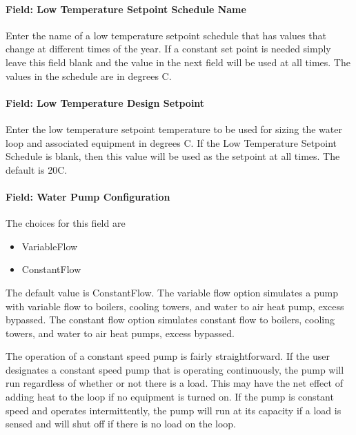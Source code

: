 \paragraph{Field: Low Temperature Setpoint Schedule Name}\label{field-low-temperature-setpoint-schedule-name}

Enter the name of a low temperature setpoint schedule that has values that change at different times of the year. If a constant set point is needed simply leave this field blank and the value in the next field will be used at all times. The values in the schedule are in degrees C.

\paragraph{Field: Low Temperature Design Setpoint}\label{field-low-temperature-design-setpoint}

Enter the low temperature setpoint temperature to be used for sizing the water loop and associated equipment in degrees C. If the Low Temperature Setpoint Schedule is blank, then this value will be used as the setpoint at all times. The default is 20C.

\paragraph{Field: Water Pump Configuration}\label{field-water-pump-configuration}

The choices for this field are

\begin{itemize}
\item
  VariableFlow
\item
  ConstantFlow
\end{itemize}

The default value is ConstantFlow. The variable flow option simulates a pump with variable flow to boilers, cooling towers, and water to air heat pump, excess bypassed. The constant flow option simulates constant flow to boilers, cooling towers, and water to air heat pumps, excess bypassed.

The operation of a constant speed pump is fairly straightforward. If the user designates a constant speed pump that is operating continuously, the pump will run regardless of whether or not there is a load. This may have the net effect of adding heat to the loop if no equipment is turned on. If the pump is constant speed and operates intermittently, the pump will run at its capacity if a load is sensed and will shut off if there is no load on the loop.

